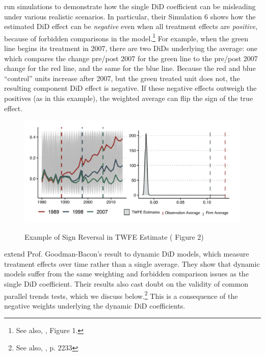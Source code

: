 \documentclass[12pt]{article}
\begin{document}
\citet{baker2022much} run simulations to demonstrate how the single DiD coefficient can be misleading under various realistic scenarios. In particular, their Simulation 6 shows how the estimated DiD effect can be \textit{negative} even when all treatment effects are \textit{positive}, because of forbidden comparisons in the model.\footnote{See also, \citet{sunshapiro2022a}, Figure 1.}  For example, when the green line begins its treatment in  2007, there are two DiDs underlying the average: one which compares the change pre/post 2007 for the green line to the pre/post 2007 change for the red line, and the same for the blue line. Because the red and blue “control” units increase after 2007, but the green treated unit does not, the resulting component DiD effect is negative. If these negative effects outweigh the positives (as in this example), the weighted average can flip the sign of the true effect.
\begin{figure}[H]
    \centering
    \caption{Example of Sign Reversal in TWFE Estimate (\citet{baker2022much} Figure 2)}
    \includegraphics[width=6in]{Figures/Baker et al. (2022) Figure 2.png}
    \label{fig:baker-fig2}
\end{figure}
\noindent \citet{sunabr2021a} extend Prof. Goodman-Bacon’s result to dynamic DiD models, which measure treatment effects over time rather than a single average. They show that dynamic models suffer from the same weighting and forbidden comparison issues as the single DiD coefficient. Their results also cast doubt on the validity of common parallel trends tests, which we discuss below.\footnote{See also, \citet{roth2023s}, p. 2233}  This is a consequence of the negative weights underlying the dynamic DiD coefficients.
\end{document}
